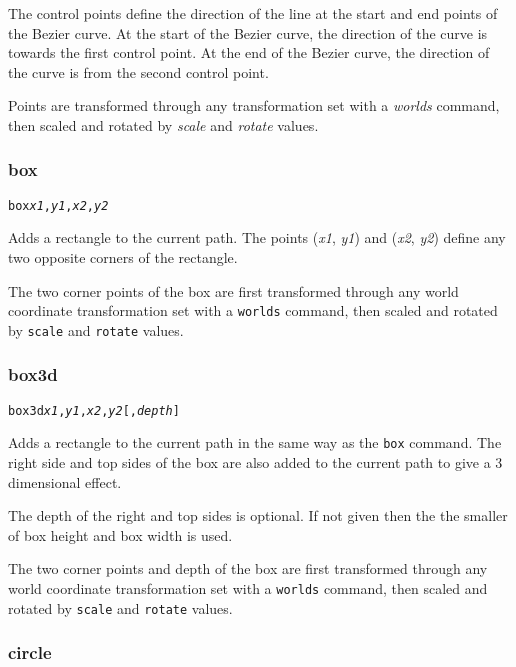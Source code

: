 The control points define the direction of the line at the start and
end points of the Bezier curve.
At the start of the Bezier curve, the direction of the curve is towards
the first control point.
At the end of the Bezier curve, the direction of the curve is from
the second control point.

Points are transformed through any
transformation set with a \textit{worlds} command,
then scaled and rotated by \textit{scale}
and \textit{rotate} values.

\subsubsection{box}

\begin{alltt}
box \textit{x1}, \textit{y1}, \textit{x2}, \textit{y2}
\end{alltt}

Adds a rectangle to the current path.
The points
(\textit{x1}, \textit{y1}) and (\textit{x2}, \textit{y2}) define
any two opposite corners of the rectangle.

The two corner points of the box
are first transformed through any world coordinate
transformation set with a \texttt{worlds} command,
then scaled and rotated by \texttt{scale}
and \texttt{rotate} values.

\subsubsection{box3d}

\begin{alltt}
box3d \textit{x1}, \textit{y1}, \textit{x2}, \textit{y2} [, \textit{depth}]
\end{alltt}

Adds a rectangle to the current path in the same way as
the \texttt{box} command.  The right side and top sides of the
box are also added to the current path to give a 3 dimensional effect.

The depth of the right and top sides is optional.  If not given
then the the smaller of box height and box width is used.

The two corner points and depth of the box
are first transformed through any world coordinate
transformation set with a \texttt{worlds} command,
then scaled and rotated by \texttt{scale}
and \texttt{rotate} values.

\subsubsection{circle}

